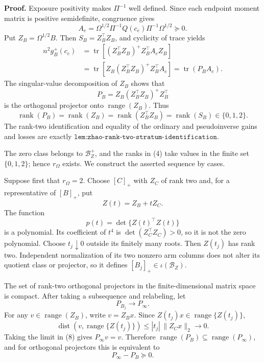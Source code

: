 \textbf{Proof.}
Exposure positivity makes \(\Pi^{-1}\) well defined.  Since each endpoint moment matrix is positive semidefinite, congruence gives
\[
A_e=\Omega^{1/2}\Pi^{-1}Q(c_e)\Pi^{-1}\Omega^{1/2}\succeq0.
\tag{1}
\]
Put \(Z_B=\Omega^{1/2}B\).  Then \(S_B=Z_B^{\top}Z_B\), and cyclicity of trace yields
\[
\begin{aligned}
n^2g_B^+(c_e)
&=\operatorname{tr}\!\left[(Z_B^{\top}Z_B)^+Z_B^{\top}A_eZ_B\right]\\
&=\operatorname{tr}\!\left[Z_B(Z_B^{\top}Z_B)^+Z_B^{\top}A_e\right]
=\operatorname{tr}(P_BA_e).
\end{aligned}
\tag{2}
\]
The singular-value decomposition of \(Z_B\) shows that
\[
P_B=Z_B(Z_B^{\top}Z_B)^+Z_B^{\top}
\tag{3}
\]
is the orthogonal projector onto \(\operatorname{range}(Z_B)\).  Thus
\[
\operatorname{rank}(P_B)=\operatorname{rank}(Z_B)
=\operatorname{rank}(Z_B^{\top}Z_B)
=\operatorname{rank}(S_B)\in\{0,1,2\}.
\tag{4}
\]
The rank-two identification and equality of the ordinary and pseudoinverse gains and losses are exactly \(\texttt{lem:zhao-rank-two-stratum-identification}\).

The zero class belongs to \(\mathcal B_Z^+\), and the ranks in (4) take values in the finite set \(\{0,1,2\}\); hence \(r_\Omega\) exists.  We construct the asserted sequence by cases.

Suppose first that \(r_\Omega=2\).  Choose \([C]_+\) with \(Z_C\) of rank two and, for a representative of \([B]_+\), put
\[
Z(t)=Z_B+tZ_C.
\tag{5}
\]
The function
\[
p(t)=\det\{Z(t)^{\top}Z(t)\}
\tag{6}
\]
is a polynomial.  Its coefficient of \(t^4\) is \(\det(Z_C^{\top}Z_C)>0\), so it is not the zero polynomial.  Choose \(t_j\downarrow0\) outside its finitely many roots.  Then \(Z(t_j)\) has rank two.  Independent normalization of its two nonzero arm columns does not alter its quotient class or projector, so it defines \([B_j]_+\in\iota(\mathcal B_Z)\).

The set of rank-two orthogonal projectors in the finite-dimensional matrix space is compact.  After taking a subsequence and relabeling, let
\[
P_{B_j}\longrightarrow P_\infty.
\tag{7}
\]
For any \(v\in\operatorname{range}(Z_B)\), write \(v=Z_Bx\).  Since \(Z(t_j)x\in\operatorname{range}\{Z(t_j)\}\),
\[
\operatorname{dist}\!\left(v,\operatorname{range}\{Z(t_j)\}\right)
\le |t_j|\,\lVert Z_Cx\rVert_2\longrightarrow0.
\tag{8}
\]
Taking the limit in (8) gives \(P_\infty v=v\).  Therefore
\(
\operatorname{range}(P_B)\subseteq\operatorname{range}(P_\infty)
\), and for orthogonal projectors this is equivalent to
\[
P_\infty-P_B\succeq0.
\tag{9}
\]

